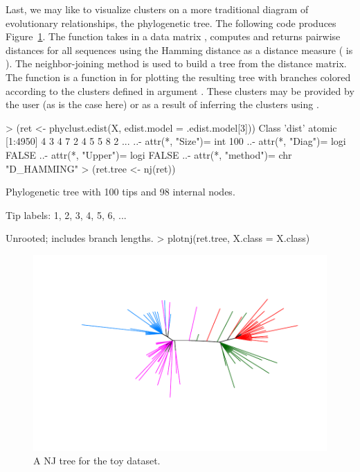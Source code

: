 Last, we may like to visualize clusters on a more traditional diagram of evolutionary relationships, the phylogenetic tree.
The following code produces Figure~\ref{fig:toynj}.
The  function takes in a data
matrix , computes and returns pairwise distances for all sequences
using the Hamming distance
as a distance measure ( is ).
The neighbor-joining method \citep{Saitou1987} is used to build a tree from
the distance matrix. The function  is a function in  for plotting
the resulting tree with branches colored according to the clusters defined in argument .
These clusters may be provided by the user (as is the case here) or as a result of inferring the clusters using .
\begin{Code}
> (ret <- phyclust.edist(X, edist.model = .edist.model[3]))
Class 'dist'  atomic [1:4950] 4 3 4 7 2 4 5 5 8 2 ...
  ..- attr(*, "Size")= int 100
  ..- attr(*, "Diag")= logi FALSE
  ..- attr(*, "Upper")= logi FALSE
  ..- attr(*, "method")= chr "D_HAMMING"
> (ret.tree <- nj(ret))

Phylogenetic tree with 100 tips and 98 internal nodes.

Tip labels:
        1, 2, 3, 4, 5, 6, ...

Unrooted; includes branch lengths.
> plotnj(ret.tree, X.class = X.class)
\end{Code}
\begin{figure}[h]
\begin{center}
\includegraphics[width=5.0in]{./phyclust-include/f-toynj}
\caption{A NJ tree for the toy dataset.}
\label{fig:toynj}
\end{center}
\end{figure}




